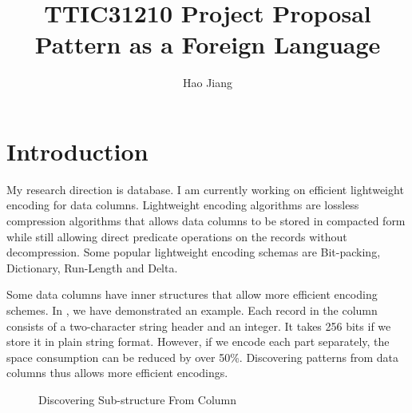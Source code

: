 \documentclass{article}
\title{TTIC31210 Project Proposal \\ 
\vspace{2mm} 
\Large{Pattern as a Foreign Language}}
\date{}
\author{Hao Jiang}
\begin{document}
\maketitle

\section{Introduction}

My research direction is database. I am currently working on
efficient lightweight encoding for data columns. Lightweight encoding algorithms
are lossless compression algorithms that allows data columns to be stored
in compacted form while still allowing direct predicate operations on the
records without decompression. Some popular lightweight encoding schemas are
Bit-packing, Dictionary, Run-Length and Delta.

Some data columns have inner structures that allow more efficient
encoding schemes. In , we have demonstrated an example. Each
record in the column consists of a two-character string header and an integer.
It takes 256 bits if we store it in plain string format. However, if we
encode each part separately, the space consumption can be reduced by over 50\%.
Discovering patterns from data columns thus allows more efficient encodings.

\begin{figure}
\centering
{}
\caption{Discovering Sub-structure From Column}
\label{fig:example}
\end{figure}
\end{document}
